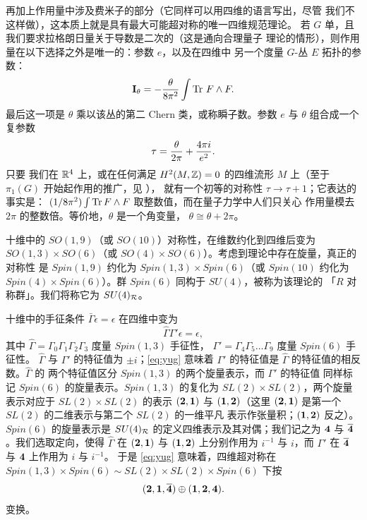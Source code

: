  再加上作用量中涉及费米子的部分（它同样可以用四维的语言写出，尽管
我们不这样做），这本质上就是具有最大可能超对称的唯一四维规范理论。
若 $G$ 单，且我们要求拉格朗日量关于导数是二次的（这是通向合理量子
理论的情形），则作用量在以下选择之外是唯一的：参数 $e$，以及在四维中
另一个度量 $G$-丛 $E$ 拓扑的参数： %
\setcounter{equation}{10}
\begin{equation}\label{eq:oopy}
{{\cmmib I}}_{\theta}=-{\theta\over
8\pi^2}\int \Tr \,F\wedge F.
\end{equation}
 最后这一项是 $\theta$ 乘以该丛的第二 Chern 类，或称瞬子数。参数
$e$ 与 $\theta$ 组合成一个复参数
\setcounter{equation}{11}
\begin{equation}\label{eq:ingo}
\tau={\theta\over 2\pi}+{4\pi i\over e^2}.
\end{equation}
 只要
我们在 $\Bbb{R}^4$ 上，或在任何满足 $H^2(M,\Bbb{Z})=0$ 的四维流形
$M$ 上（至于 $\pi_1(G)$ 开始起作用的推广，见 \cite{ref45,ref26}），
就有一个初等的对称性 $\tau\to\tau+1$；它表达的事实是：
$(1/8\pi^2)\int\Tr F\wedge F$ 取整数值，而在量子力学中人们只关心
作用量模去 $2\pi$ 的整数倍。等价地，$\theta$ 是一个角变量，
$\theta\cong\theta+2\pi$。

 十维中的 $SO(1,9)$（或 $SO(10)$）对称性，在维数约化到四维后变为
$SO(1,3)\times
SO(6)$（或 $SO(4)\times SO(6)$）。考虑到理论中存在旋量，真正的对称性
是 $Spin(1,9)$ 约化为 $Spin(1,3)\times Spin(6)$（或 $Spin(10)$ 约化为
$Spin(4)\times Spin(6)$）。群 $Spin(6)$ 同构于 $SU(4)$，被称为该理论的
「$R$ 对称群」。我们将称它为 $SU(4)_{{\cal R}}$。

 十维中的手征条件 $\bar\Gamma\epsilon=\epsilon$ 在四维中变为 %
\setcounter{equation}{12}
\begin{equation}\label{eq:yug}
\hat\Gamma
\Gamma'\epsilon=\epsilon,
\end{equation}
 其中
$\hat\Gamma=\Gamma_0\Gamma_1\Gamma_2\Gamma_3$ 度量 $Spin(1,3)$ 手征性，
$\Gamma'=\Gamma_4\Gamma_5\dots\Gamma_9$ 度量 $Spin(6)$ 手征性。
$\hat \Gamma$ 与 $\Gamma'$ 的特征值为 $\pm i$；\eqref{eq:yug} 意味着
$\Gamma'$ 的特征值是 $\hat \Gamma$ 的特征值的相反数。$\hat\Gamma$ 的
两个特征值区分 $Spin(1,3)$ 的两个旋量表示，而 $\Gamma'$ 的特征值
同样标记 $Spin(6)$ 的旋量表示。$Spin(1,3)$ 的复化为
$SL(2)\times SL(2)$，两个旋量表示对应于 $SL(2)\times SL(2)$ 的表示
$({\bf 2},{\bf 1})$ 与 $({\bf 1},{\bf 2})$（这里 $({\bf
2},{\bf 1})$ 是第一个 $SL(2)$ 的二维表示与第二个 $SL(2)$ 的一维平凡
表示作张量积；$({\bf 1},{\bf 2})$ 反之）。$Spin(6)$ 的旋量表示是
$SU(4)_{{\cal R}}$ 的定义四维表示及其对偶；我们记之为 ${\bf 4}$ 与
$\bar{\bf 4}$。我们选取定向，使得 $\hat \Gamma$ 在
$({\bf 2},{\bf 1})$ 与 $({\bf 1},{\bf 2})$ 上分别作用为 $i^{-1}$ 与
$i$，而 $\Gamma'$ 在 $\bar {\bf 4}$ 与 ${\bf
4}$ 上作用为 $i$ 与 $i^{-1}$。
 于是
\eqref{eq:yug} 意味着，四维超对称在 $Spin(1,3)\times Spin(6)\sim SL(2)\times SL(2)\times
Spin(6)$ 下按 %
\setcounter{equation}{13}
\begin{equation}\label{eq:jugo}
({\bf 2},{\bf 1},\bar{\bf 4})\oplus ({\bf 1},{\bf 2},{\bf 4}).
\end{equation}
 变换。

